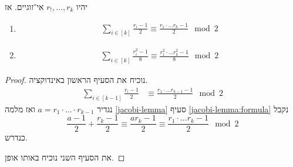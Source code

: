 \documentclass[a4paper,10pt,twoside,openany]{book}
\begin{document}
\begin{corollary}
יהיו
$r_!, \ldots, r_k$
אי־זוגיים. אז
\begin{enumerate}
\item
\begin{align*}
\sum_{i \in [k]} \frac{r_i - 1}{2} \equiv \frac{r_1 \cdot \ldots r_k - 1}{2} \mod{2}
\end{align*}
\item 
\begin{align*}
\sum_{i \in [k]} \frac{r_i^2 - 1}{8} \equiv \frac{r_1^2 \cdot \ldots r_k^2 - 1}{8} \mod{2}
\end{align*}
\end{enumerate}
\end{corollary}
\begin{proof}
נוכיח את הסעיף הראשון באינדוקציה.
\begin{align*}
\sum_{i \in [k-1]} \frac{r_i - 1}{2} &\equiv \frac{r_1 \cdot \ldots r_{k-1} - 1}{2} \mod{2}
\end{align*}
נגדיר
$a = r_1 \cdot \ldots \cdot r_{k-1}$
ואז מלמה
\ref{jacobi-lemma}
סעיף
\ref{jacobi-lemma:formula}
נקבל
\[\frac{a-1}{2} + \frac{r_k - 1}{2} \equiv \frac{a r_k - 1}{2} \equiv \frac{r_1 \cdot \ldots r_k - 1}{2} \mod{2}\]
כנדרש.

את הסעיף השני נוכיח באותו אופן.
\end{proof}
\end{document}
